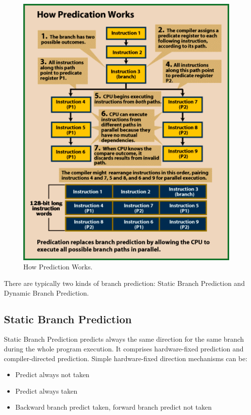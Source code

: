 \documentclass[doc,natbib,12pt]{apa6}
\begin{document}
	\begin{figure}[htpb]
		\centering
		\includegraphics[width=1\textwidth]{how_Predication_Works-Byte.png}
		\caption{\label{fig:prediction}How Prediction Works. \citep{Byte}}
	\end{figure}
	
	There are typically two kinds of branch prediction: Static Branch Prediction and Dynamic Branch Prediction.
	
	\subsection{Static Branch Prediction}
	Static Branch Prediction predicts always the same direction for the same branch during the whole program execution.
	It comprises hardware-fixed prediction and compiler-directed prediction.
	Simple hardware-fixed direction mechanisms can be:
	\begin{itemize}
		\item Predict always not taken
		\item Predict always taken
		\item Backward branch predict taken, forward branch predict not taken
	\end{itemize}
	
\end{document}
